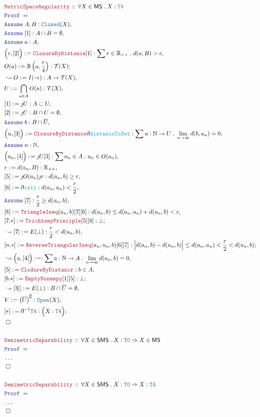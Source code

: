 \documentclass[12pt]{scrartcl}
\newcommand{\TYPE}[1]{\textcolor{NavyBlue}{\mathtt{#1}}}
\newcommand{\FUNC}[1]{\textcolor{Cerulean}{\mathtt{#1}}}
\newcommand{\LOGIC}[1]{\textcolor{Blue}{\mathtt{#1}}}
\newcommand{\THM}[1]{\textcolor{Maroon}{\mathtt{#1}}}
\renewcommand{\.}{\; . \;}
\newcommand{\de}{: \kern 0.1pc =}
\newcommand{\Act}[1]{\left( #1 \right)}
\newcommand{\Theorem}[2]{& \THM{#1} \, :: \, #2 \\ & \Proof = \\ }
\newcommand{\Page}[1]{ \begin{align*} #1 \end{align*}   }
\newcommand{ \bd }{ \ByDef }
\newcommand{\NoProof}{ & \ldots \\ \EndProof}
\newcommand{\Imply}{\Rightarrow}
\newcommand{\Reals}{\mathbb{R} }
\newcommand{\Nat}{\mathbb{N} }
\renewcommand{\c}{\complement}
\newcommand{\Say}[3]{& #1 \de #2 : #3, \\}
\newcommand{\Conclude}[3]{& #1 \de #2 : #3; \\}
\newcommand{\Derive}[3]{& \leadsto #1 \de #2 : #3, \\}
\newcommand{\Assume}[2]{& \LOGIC{Assume} \; #1 : #2, \\}
\newcommand{\QED}{\; \square}
\newcommand{\EndProof}{& \QED \\}
\newcommand{\ByDef}{\eth}
\newcommand{\ByConstr}{\jmath}
\newcommand{\Proof}{\LOGIC{Proof} \; }
\newcommand{\T}{\mathcal{T}}
\newcommand{\SMS}{\mathsf{SMS}}
\newcommand{\MS}{\mathsf{MS}}
\begin{document}
\Page{
	\Theorem{MetricSpaceRegularity}{\forall X \in \MS \.  X : \TYPE{T4}  }
	\Assume{A,B}{\TYPE{Closed}(X)}
	\Assume{[1]}{A \cap B = \emptyset}
	\Assume{a}{A}
	\Say{\Big(r,[2]\Big)}{\THM{ClosureByDistance}[1]}{\sum r \in \Reals_{++} \. d(a,B) >  r}
	\Conclude{O(a)}{\mathbb{B}\Act{a,\frac{r}{4}}}{\T(X)}
	\Derive{O}{I(\to)}{A \to \T(X)}
	\Say{U}{\bigcap_{a \in A} O(a)}{\T(X)}
	\Say{[1]}{\ByConstr U}{A \subset U}
	\Say{[2]}{\ByConstr U}{B \cap U = \emptyset}
	\Assume{b}{ B \cap \overline{U}}
	\Say{\Big( u, [3] \Big)}{\THM{ClosureByDistance}\bd \FUNC{distanceToSet}}{\sum u : \Nat \to U \. \lim_{n \to \infty} d(b,u_n) = 0}
	\Assume{n}{\Nat}
	\Say{\Big( a_n, [4]\Big)}{\ByConstr U [3]}{\sum a_n \in A \. u_n \in O(a_n)}
	\Say{r}{ d(a_n,B)}{\Reals_{++}}
	\Say{[5]}{\ByConstr O(a_n) \ByConstr r }{   d(a_n, b) \ge  r}
	\Say{[6]}{\bd \FUNC{cell}}{d(a_n,u_n) < \frac{r}{2}}
	\Assume{[7]}{\frac{r}{2} \ge d(u_n,b)}
	\Say{[8]}{\THM{TriangleIneq}(a_n,b)[7][6]}{   d(a_n,b) \le  d(a_n,u_n) + d(u_n,b) < r  }
	\Conclude{[7.*]}{\THM{TrichtomyPrinciple}[5][8]}{\bot}
	\Derive{[7]}{E(\bot)}{\frac{r}{2} < d(u_n,b)}
	\Conclude{[n.*]}{\THM{ReverseTriangularIneq}(a_n,u_n,b)[6][7] }{\Big| d(a_n,b) - d(u_n,b) \Big| \le d(a_n,u_n) < \frac{r}{2}  <  d(u_n,b) }
	\Derive{\Big(a,[4]\Big)}{}{\sum a : \Nat \to A \. \lim_{n \to \infty} d(a_n,b) = 0}
	\Say{[5]}{\THM{ClodureByDistancr}}{b \in A}
	\Conclude{[b.*]}{\THM{EmptyNonempy}[1][5]}{\bot}
	\Derive{[3]]}{E(\bot)}{B \cap \overline{U} = \emptyset }
	\Say{V}{\left( \overline{U} \right)^\c}{\TYPE{Open}(X)}
	\Conclude{[*]}{\bd^{-1} \TYPE{T4}}{\Big( X : \TYPE{T4} \Big)}
	\EndProof
	\\
	\Theorem{SemimetricSeparability}{\forall X \in \SMS \. X : \TYPE{T0} \Imply X \in \MS}
	\NoProof
	\\
	\Theorem{SemimetricSeparability}{\forall X \in \SMS \. X : \TYPE{T0} \Imply X : \TYPE{T4}}
	\NoProof
}
\end{document}
